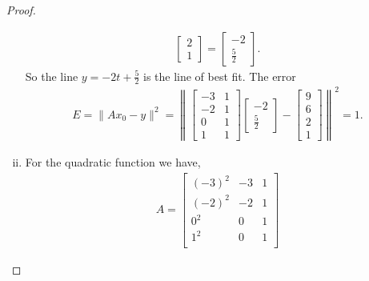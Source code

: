 \documentclass[leqno]{article}
\theoremstyle{nonumberplain}
\newtheorem{proof}{Proof}
\begin{document}
\begin{proof}
\begin{enumerate}[(i)]
\begin{align*}
\begin{bmatrix}
2\\
1
\end{bmatrix}
=\begin{bmatrix}
-2\\
\frac{5}{2}
\end{bmatrix}.
\end{align*}
So the line $y=-2t+\frac{5}{2}$ is the line of best fit. The error 
\begin{align*}
E=\|Ax_0-y\|^2=\left\| \begin{bmatrix}
-3 & 1\\
-2 & 1\\
0 & 1\\
1 & 1
\end{bmatrix} 
\begin{bmatrix}
-2\\
\frac{5}{2}
\end{bmatrix}
-\begin{bmatrix}
9\\
6\\
2\\
1
\end{bmatrix}\right\|^2= 1.
\end{align*}

\item For the quadratic function we have,
\begin{align*}
A=\begin{bmatrix}
(-3)^2 & -3 & 1\\
(-2)^2 & -2 & 1\\
0^2 & 0 & 1\\
1^2 & 0 & 1\\
\end{bmatrix}
\end{align*}
\end{enumerate}
\end{proof}



\pagebreak

\end{document}
